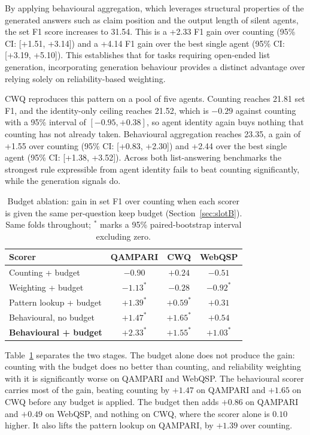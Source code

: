 \documentclass[11pt]{article}
\begin{document}
By applying behavioural aggregation, which leverages structural properties of the generated answers such as claim position and the output length of silent agents, the set F1 score increases to 31.54. This is a +2.33 F1 gain over counting (95\% CI: [+1.51, +3.14]) and a +4.14 F1 gain over the best single agent (95\% CI: [+3.19, +5.10]). This establishes that for tasks requiring open-ended list generation, incorporating generation behaviour provides a distinct advantage over relying solely on reliability-based weighting.

CWQ reproduces this pattern on a pool of five agents. Counting reaches 21.81 set F1, and the identity-only ceiling reaches 21.52, which is $-0.29$ against counting with a 95\% interval of $[-0.95, +0.38]$, so agent identity again buys nothing that counting has not already taken. Behavioural aggregation reaches 23.35, a gain of +1.55 over counting (95\% CI: [+0.83, +2.30]) and +2.44 over the best single agent (95\% CI: [+1.38, +3.52]). Across both list-answering benchmarks the strongest rule expressible from agent identity fails to beat counting significantly, while the generation signals do.

\begin{table}[t]
\centering
\small
\caption{Budget ablation: gain in set F1 over counting when each scorer is given the same per-question keep budget (Section~\ref{sec:slotB}). Same folds throughout; $^*$ marks a 95\% paired-bootstrap interval excluding zero.}
\label{tab:ablation}
\begin{tabular}{lccc}
\toprule
Scorer & QAMPARI & CWQ & WebQSP \\
\midrule
Counting + budget & $-0.90$ & $+0.24$ & $-0.51$ \\
Weighting + budget & $-1.13^*$ & $-0.28$ & $-0.92^*$ \\
Pattern lookup + budget & $+1.39^*$ & $+0.59^*$ & $+0.31$ \\
Behavioural, no budget & $+1.47^*$ & $+1.65^*$ & $+0.54$ \\
\textbf{Behavioural + budget} & $\mathbf{+2.33^*}$ & $\mathbf{+1.55^*}$ & $\mathbf{+1.03^*}$ \\
\bottomrule
\end{tabular}
\end{table}

Table~\ref{tab:ablation} separates the two stages. The budget alone does not produce the gain: counting with the budget does no better than counting, and reliability weighting with it is significantly worse on QAMPARI and WebQSP. The behavioural scorer carries most of the gain, beating counting by $+1.47$ on QAMPARI and $+1.65$ on CWQ before any budget is applied. The budget then adds $+0.86$ on QAMPARI and $+0.49$ on WebQSP, and nothing on CWQ, where the scorer alone is $0.10$ higher. It also lifts the pattern lookup on QAMPARI, by $+1.39$ over counting.
\end{document}
